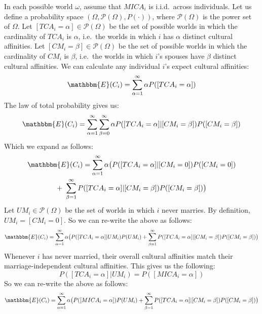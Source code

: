 In each possible world $\omega$, assume that $MICA_{i}$ is i.i.d.\ across individuals. Let us define a probability space $(\Omega,\mathcal{P}(\Omega),P(\cdot))$, where $\mathcal{P}(\Omega)$ is the power set of $\Omega$. Let $[TCA_{i}=\alpha]\in\mathcal{P}(\Omega)$ be the set of possible worlds in which the cardinality of $TCA_{i}$ is $\alpha$, i.e.\ the worlds in which $i$ has $\alpha$ distinct cultural affinities. Let $[CM_{i}=\beta]\in\mathcal{P}(\Omega)$ be the set of possible worlds in which the cardinality of $CM_{i}$ is $\beta$, i.e.\ the worlds in which $i$'s spouses have $\beta$ distinct cultural affinities. We can calculate any individual $i$'s expect cultural affinities:
\begin{equation}
    \mathbbm{E}(C_{i})=\sum_{\alpha=1}^{\infty}\alpha P([TCA_{i}=\alpha])
\end{equation}
The law of total probability gives us:
\begin{equation}
    \mathbbm{E}(C_{i}) =  \sum_{\alpha=1}^{\infty}\sum_{\beta=0}^{\infty}\alpha P([TCA_{i}=\alpha]|[CM_{i}=\beta])P([CM_{i}=\beta])
\end{equation}
Which we expand as follows:
\begin{multline}
    \mathbbm{E}(C_{i})= \sum_{\alpha=1}^{\infty}\alpha\big(P([TCA_{i}=\alpha]|[CM_{i}=0])P([CM_{i}=0]) \\ + \  \sum_{\beta=1}^{\infty} P([TCA_{i}=\alpha]|[CM_{i}=\beta])P([CM_{i}=\beta])\big)
\end{multline}
Let $UM_{i}\in\mathcal{P}(\Omega)$ be the set of worlds in which $i$ never marries. By definition, $UM_{i}=[CM_{i}=0]$. So we can re-write the above as follows:
\begin{equation}
    \mathbbm{E}(C_{i})=\sum_{\alpha=1}^{\infty}\alpha\big(P([TCA_{i}=\alpha]|UM_{i})P(UM_{i}) +  \sum_{\beta=1}^{\infty} P([TCA_{i}=\alpha]|[CM_{i}=\beta])P([CM_{i}=\beta])\big)
\end{equation}
Whenever $i$ has never married, their overall cultural affinities match their marriage-independent cultural affinities. This gives us the following:
\begin{equation}
    P([TCA_{i}=\alpha]|UM_{i})=P([MICA_{i}=\alpha])
\end{equation}
So we can re-write the above as follows:
\begin{equation}
    \mathbbm{E}(C_{i})=\sum_{\alpha=1}^{\infty}\alpha\big(P([MICA_{i}=\alpha])P(UM_{i}) + \sum_{\beta=1}^{\infty} P([TCA_{i}=\alpha]|[CM_{i}=\beta])P([CM_{i}=\beta])\big)
\end{equation}
